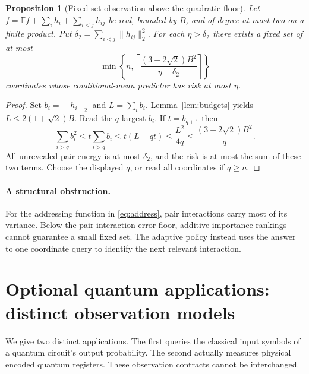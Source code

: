 \documentclass[11pt,letterpaper]{article}
\newtheorem{proposition}[theorem]{Proposition}
\theoremstyle{definition}
\newcommand{\E}{\mathbb E}
\newcommand{\norm}[1]{\lVert #1\rVert}
\begin{document}
\begin{proposition}[Fixed-set observation above the quadratic floor]\label{prop:fixed}
Let $f=\E f+\sum_i h_i+\sum_{i<j}h_{ij}$ be real, bounded by $B$,
and of degree at most two on a finite product. Put
$\delta_2=\sum_{i<j}\norm{h_{ij}}_2^2$. For each $\eta>\delta_2$
there exists a fixed set of at most
\begin{equation}\label{eq:fixed}
\min\left\{n,\left\lceil
\frac{(3+2\sqrt2)B^2}{\eta-\delta_2}\right\rceil\right\}
\end{equation}
coordinates whose conditional-mean predictor has risk at most $\eta$.
\end{proposition}
\begin{proof}
Set $b_i=\norm{h_i}_2$ and $L=\sum_i b_i$. Lemma~\ref{lem:budgets}
yields $L\le2(1+\sqrt2)B$. Read the $q$ largest $b_i$. If
$t=b_{q+1}$ then
\[
\sum_{i>q}b_i^2\le t\sum_{i>q}b_i\le t(L-qt)\le\frac{L^2}{4q}
\le\frac{(3+2\sqrt2)B^2}{q}.
\]
All unrevealed pair energy is at most $\delta_2$, and the risk is
at most the sum of these two terms. Choose the displayed $q$, or read
all coordinates if $q\ge n$.
\end{proof}
\paragraph{A structural obstruction.}
For the addressing function in \eqref{eq:address}, pair interactions
carry most of its variance. Below the pair-interaction error floor,
additive-importance rankings cannot guarantee a small fixed set. The
adaptive policy instead uses the answer to one coordinate query to
identify the next relevant interaction.

\section{Optional quantum applications: distinct observation models}\label{sec:quantum}
We give two distinct applications. The first queries the classical
input symbols of a quantum circuit's output probability. The second
actually measures physical encoded quantum registers. These observation
contracts cannot be interchanged.
\end{document}
